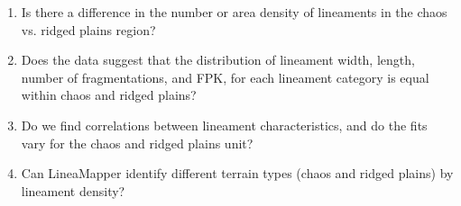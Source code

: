 \begin{enumerate}
    \item Is there a difference in the number or area density of lineaments in the chaos vs. ridged plains region?
    \item Does the data suggest that the distribution of lineament width, length, number of fragmentations, and FPK, for each lineament category is equal within chaos and ridged plains?
    \item Do we find correlations between lineament characteristics, and do the fits vary for the chaos and ridged plains unit?
    \item Can LineaMapper identify different terrain types (chaos and ridged plains) by lineament density?
\end{enumerate}

